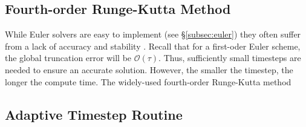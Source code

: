 \subsection{Fourth-order Runge-Kutta Method}
\label{subsec:rk4}
%
\par  While Euler solvers are easy to implement (see \S\ref{subsec:euler}) they often suffer from a lack of accuracy and stability \citep{numerical_press_1992}. Recall that for a first-oder Euler scheme, the global truncation error will be $\mathcal{O}(\tau)$. Thus, sufficiently small timesteps are needed to ensure an accurate solution. However, the smaller the timestep, the longer the compute time. The widely-used fourth-order Runge-Kutta method 
\subsection{Adaptive Timestep Routine}
\label{subsec:adapt}
%